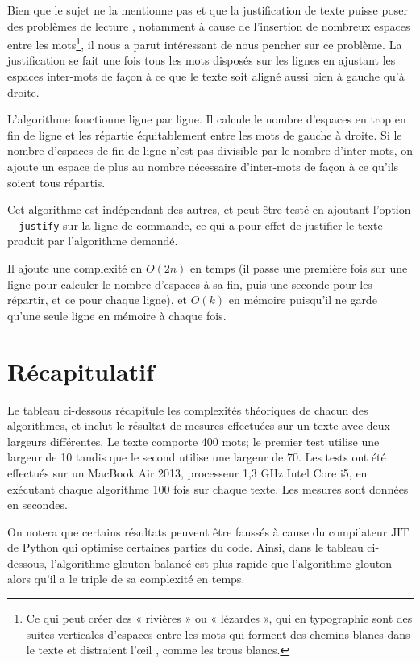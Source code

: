 \documentclass[a4paper, 11pt]{article}
\begin{document}
Bien que le sujet ne la mentionne pas et que la justification de texte puisse
poser des problèmes de lecture \cite{Van96cognitive}, notamment à cause de
l'insertion de nombreux espaces entre les mots\footnote{Ce qui peut créer des
« rivières » ou « lézardes », qui en typographie sont des suites verticales
d'espaces entre les mots qui forment des chemins blancs dans le texte et
distraient l'œil \cite{Harkins12fr}, comme les trous blancs.}, il nous a parut
intéressant de nous pencher sur ce problème. La justification se fait une fois
tous les mots disposés sur les lignes en ajustant les espaces inter-mots de
façon à ce que le texte soit aligné aussi bien à gauche qu'à droite.

L'algorithme fonctionne ligne par ligne. Il calcule le nombre d'espaces en trop
en fin de ligne et les répartie équitablement entre les mots de gauche à droite.
Si le nombre d'espaces de fin de ligne n'est pas divisible par le nombre
d'inter-mots, on ajoute un espace de plus au nombre nécessaire d'inter-mots de
façon à ce qu'ils soient tous répartis.

Cet algorithme est indépendant des autres, et peut être testé en ajoutant
l'option \verb|--justify| sur la ligne de commande, ce qui a pour effet de
justifier le texte produit par l'algorithme demandé.

Il ajoute une complexité en $O(2n)$ en temps (il passe une première fois sur une
ligne pour calculer le nombre d'espaces à sa fin, puis une seconde pour les
répartir, et ce pour chaque ligne), et $O(k)$ en mémoire puisqu'il ne garde
qu'une seule ligne en mémoire à chaque fois.

\part{Récapitulatif}

Le tableau ci-dessous récapitule les complexités théoriques de chacun des
algorithmes, et inclut le résultat de mesures effectuées sur un texte avec deux
largeurs différentes. Le texte comporte 400 mots; le premier test utilise une
largeur de 10 tandis que le second utilise une largeur de 70. Les tests ont été
effectués sur un MacBook Air 2013, processeur 1,3 GHz Intel Core i5, en
exécutant chaque algorithme 100 fois sur chaque texte. Les mesures sont données
en secondes.

On notera que certains résultats peuvent être faussés à cause du compilateur JIT
de Python qui optimise certaines parties du code. Ainsi, dans le tableau
ci-dessous, l'algorithme glouton balancé est plus rapide que l'algorithme
glouton alors qu'il a le triple de sa complexité en temps.
\end{document}

